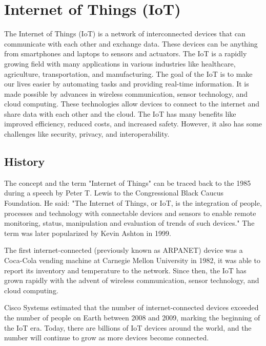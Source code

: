 \chapter{Internet of Things (IoT)}
\label{chap:iot}

The Internet of Things (IoT) is a network of interconnected devices that can communicate with each other and exchange
data. These devices can be anything from smartphones and laptops to sensors and actuators. The IoT is a rapidly growing
field with many applications in various industries like healthcare, agriculture, transportation, and manufacturing. The
goal of the IoT is to make our lives easier by automating tasks and providing real-time information. It is made
possible by advances in wireless communication, sensor technology, and cloud computing. These technologies allow devices
to connect to the internet and share data with each other and the cloud. The IoT has many benefits like improved
efficiency, reduced costs, and increased safety. However, it also has some challenges like security, privacy, and
interoperability.

\section{History}
\label{sec:iot-history}

The concept and the term "Internet of Things" can be traced back to the 1985 during a speech by Peter T. Lewis to the
Congressional Black Caucus Foundation.\cite{chetansharma-2016} He said: "The Internet of Things, or IoT, is the
integration of people, processes and technology with connectable devices and sensors to enable remote monitoring,
status, manipulation and evaluation of trends of such devices." The term was later popularized by Kevin Ashton in
1999.\cite{ashton-2009}

The first internet-connected (previously known as ARPANET) device was a Coca-Cola vending machine at Carnegie Mellon
University in 1982,\cite{cscmuedu} it was able to report its inventory and temperature to the network. Since then,
the IoT has grown rapidly with the advent of wireless communication, sensor technology, and cloud computing.

Cisco Systems estimated that the number of internet-connected devices exceeded the number of people on Earth between
2008 and 2009,\cite{evans-2011} marking the beginning of the IoT era. Today, there are billions of IoT devices around
the world, and the number will continue to grow as more devices become connected.

